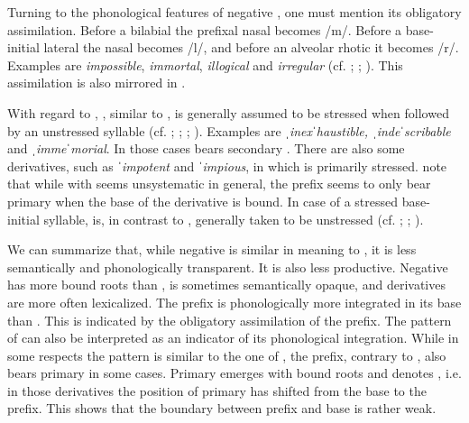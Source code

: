 Turning to the phonological features of negative , one must mention its obligatory assimilation. Before a bilabial the prefixal nasal becomes /m/. Before a base-initial lateral the nasal becomes /l/, and before an alveolar rhotic it becomes /r/. Examples are \textit{impossible}, \textit{immortal}, \textit{illogical} and \textit{irregular} (cf. \citealt[1687]{Bauer.2002}; \citealt[359]{Bauer.2013}; \citealt[123 f]{Okada.2013}). This assimilation is also mirrored in . 

With regard to , , similar to , is generally assumed to be stressed when followed by an unstressed syllable (cf. \citealt[473]{Jespersen.1965}; \citealt[381, 384]{Wells.2008};  \citealt[183]{Bauer.2013}; \citealt[126]{Okada.2013}). Examples are \textit{ˌinexˈhaustible, ˌindeˈscribable} and \textit{ˌimmeˈmorial}. In those cases  bears secondary . There are also some derivatives, such as \textit{ˈimpotent} and \textit{ˈimpious}, in which  is primarily stressed. \citet[183]{Bauer.2013} note that while   with  seems unsystematic in general,  the prefix seems to only bear primary  when the base of the derivative is bound.
In case of a stressed base-initial syllable,  is, in contrast to , generally taken to be unstressed (cf. \citealt{Wells.2008}; \citealt[183]{Bauer.2013}; \citealt[126]{Okada.2013}). 

We can summarize that, while negative  is similar in meaning to , it is less semantically and phonologically transparent. It is also less productive. Negative  has more bound roots than , is sometimes semantically opaque, and derivatives are more often lexicalized. The prefix is phonologically more integrated in its base than . This is indicated by the obligatory assimilation of the prefix. The  pattern of  can also be interpreted as an indicator of its phonological integration. While in some respects the  pattern is similar to the one of , the prefix, contrary to , also bears primary  in some cases. Primary  emerges with bound roots and denotes , i.e. in those derivatives the position of primary  has shifted from the base to the prefix. This shows that the boundary between prefix and base is rather weak.\\


